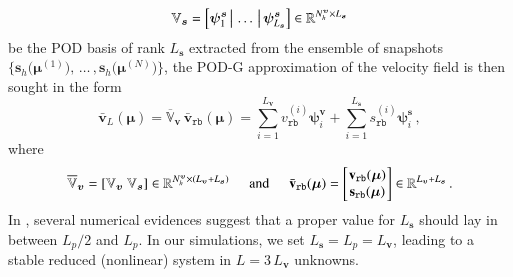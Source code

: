 \documentclass[longtitle]{elsarticle}
\numberwithin{equation}{section}
\theoremstyle{theorem}
\theoremstyle{definition}
\theoremstyle{remark}
\theoremstyle{proposition}
\numberwithin{figure}{section}
\newcommand{\bg}[1]{\boldsymbol{#1}}
\begin{document}
		\vspace*{-0.1cm}
		\begin{equation*}
			\mathbb{V}_{\bg{s}} = \left[ \bg{\psi}_1^{\bg{s}} \, \big| \, \ldots \, \big| \, \bg{\psi}_{L_{\bg{s}}}^{\bg{s}} \right] \in \mathbb{R}^{N_h^{\bg{v}} \times L_{\bg{s}}} 
			\vspace*{-0.1cm}
		\end{equation*}
		be the POD basis of rank $L_{\bg{s}}$ extracted from the ensemble of snapshots $\big\lbrace \mathbf{s}_h \big( \bg{\mu}^{(1)} \big) , \, \ldots \, , \mathbf{s}_h \big( \bg{\mu}^{(N)} \big) \big\rbrace$, the POD-G approximation of the velocity field is then sought in the form
		\vspace*{-0.2cm}
		\begin{equation*}
			\bar{\mathbf{v}}_L(\bg{\mu}) = \overline{\mathbb{V}}_{\bg{v}} \, \bar{\mathbf{v}}_{\texttt{rb}}(\bg{\mu}) = \sum_{i = 1}^{L_{\bg{v}}} v_{\texttt{rb}}^{(i)} \bg{\psi}_i^{\bg{v}} + \sum_{i = 1}^{L_{\bg{s}}} s_{\texttt{rb}}^{(i)} \bg{\psi}_i^{\bg{s}} \, ,
		\end{equation*} 
		where
		\begin{equation*}
			\overline{\mathbb{V}}_{\bg{v}} = \left[ \mathbb{V}_{\bg{v}} ~ \mathbb{V}_{\bg{s}} \right] \in \mathbb{R}^{N_h^{\bg{v}} \times (L_{\bg{v}} + L_{\bg{s}})} \hspace*{0.5cm} \text{and} \hspace*{0.5cm} \bar{\mathbf{v}}_{\texttt{rb}}(\bg{\mu}) =
			\begin{bmatrix}
			\hspace*{-0.15cm}
			\begin{array}{c}
				\mathbf{v}_{\texttt{rb}}(\bg{\mu}) \\
				\mathbf{s}_{\texttt{rb}}(\bg{\mu})
			\end{array} 
			\hspace*{-0.15cm}
			\end{bmatrix} 
			\in \mathbb{R}^{L_{\bg{v}} + L_{\bg{s}}} \, .
		\end{equation*}
		In \cite{Bal14}, several numerical evidences suggest that a proper value for $L_{\bg{s}}$ should lay in between $L_p / 2$ and $L_p$. In our simulations, we set $L_{\bg{s}} = L_p = L_{\bg{v}}$, leading to a stable reduced (nonlinear) system in $L = 3 \, L_{\bg{v}}$ unknowns.
\end{document}
